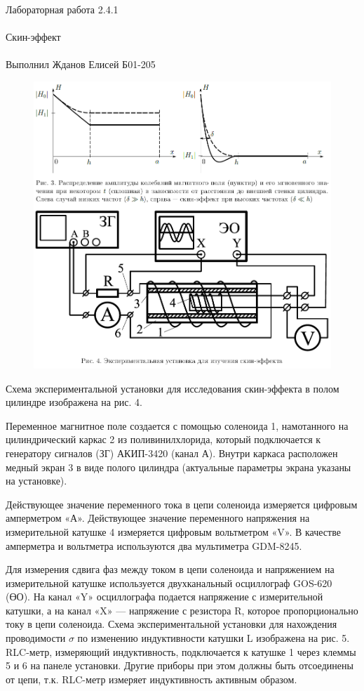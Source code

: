 \documentclass{astroedu-lab}
\begin{document}
\begin{problem}{\huge Лабораторная работа 2.4.1\\\\Скин-эффект\\\\Выполнил Жданов Елисей Б01-205}
\begin{figure}[!h]
	\centering
	\includegraphics[width=1\textwidth]{уст3.png}
	\label{fig:boiler}
\end{figure}

Схема экспериментальной установки для исследования скин-эффекта в полом цилиндре изображена на рис. 4.

Переменное магнитное поле создается с помощью соленоида 1, намотанного на цилиндрический каркас 2 из поливинилхлорида, который подключается к генератору сигналов (ЗГ) АКИП-3420 (канал А). Внутри каркаса расположен медный экран 3 в виде полого цилиндра (актуальные параметры экрана указаны на установке).

Действующее значение переменного тока в цепи соленоида измеряется цифровым амперметром «А». Действующее значение переменного напряжения на измерительной катушке 4 измеряется цифровым вольтметром «V». В качестве амперметра и вольтметра используются два мультиметра GDM-8245.

Для измерения сдвига фаз между током в цепи соленоида и напряжением на измерительной катушке используется двухканальный осциллограф GOS-620 (ӨО). На канал «Y» осциллографа подается напряжение с измерительной катушки, а на канал «X» —
напряжение с резистора R, которое пропорционально току в цепи соленоида.
Схема экспериментальной установки для нахождения проводимости $\sigma$ по изменению
индуктивности катушки L изображена на рис. 5. RLC-метр, измеряющий индуктивность,
подключается к катушке 1 через клеммы 5 и 6 на панеле установки. Другие приборы при
этом должны быть отсоединены от цепи, т.к. RLC-метр измеряет индуктивность активным
образом.


\end{problem}
\end{document}
